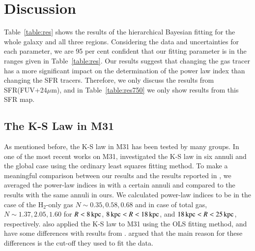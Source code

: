 %
\section{Discussion}

Table~\ref{table:res} shows the results of the hierarchical Bayesian fitting for the whole galaxy and all three regions. Considering the data and uncertainties for each parameter, we are 95 per cent confident that our fitting parameter is in the ranges given in Table~\ref{table:res}.
Our results suggest that changing the gas tracer has a more significant impact on the determination of the power law index than changing the SFR tracers. Therefore, we only discuss the results from SFR(FUV+24$\mu$m), and in Table~\ref{table:res750} we only show results from this SFR map.

\subsection{The K-S Law in M31}

As mentioned before, the K-S law in M31 has been tested by many groups. In one of the most recent works on M31, \citet{Ford13} investigated the K-S law in six annuli and the global case using the ordinary least squares fitting method. 
To make a meaningful comparison between our results and the results reported in \citet{Ford13}, we averaged the power-law indices in \citet{Ford13} with a certain annuli and compared to the results with the same annuli in ours. We calculated power-law indices to be in the case of the H$_{2}$-only gas $N \sim 0.35, 0.58, 0.68$ and in case of total gas, $N \sim 1.37, 2.05, 1.60$ for $R< 8\,{\rm kpc}$, $8\,{\rm kpc} < R < 18\,{\rm kpc}$, and $18\,{\rm kpc} < R < 25\,{\rm kpc}$, respectively.
\citet{Tabatabaei10} also applied the K-S law to M31 using the OLS fitting method, and have some differences with results from \citet{Ford13}. \citet{Ford13} argued that the main reason for these differences is the cut-off they used to fit the data. 
 
